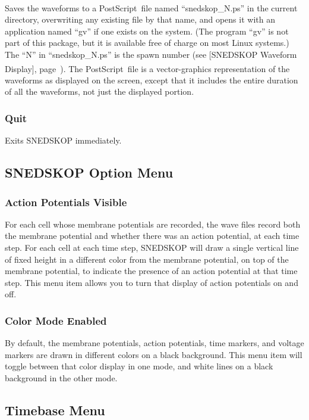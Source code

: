 \documentclass[12pt,openany,oneside]{book}
\newcommand{\tipxref}[1]{see [#1], page~\pageref{#1}}
\newcommand{\registeredsymbol}{\textsuperscript{\textregistered}}
\begin{document}
Saves the waveforms to a PostScript\registeredsymbol\ file named
``snedskop\_N.ps'' in the current directory, overwriting any existing
file by that name, and opens it with an application named ``gv'' if
one exists on the system. (The program ``gv'' is not part of this
package, but it is available free of charge on most Linux systems.)
The ``N'' in ``snedskop\_N.ps'' is the spawn number (\tipxref{SNEDSKOP Waveform Display}).
The PostScript\registeredsymbol\ file is a
vector-graphics representation of the waveforms as displayed on the
screen, except that it includes the entire duration of all the
waveforms, not just the displayed portion.

\subsubsection*{Quit}

Exits SNEDSKOP immediately.


\subsection{SNEDSKOP Option Menu}

\subsubsection*{Action Potentials Visible}

For each cell whose membrane potentials are recorded, the wave files
record both the membrane potential and whether there was an action
potential, at each time step.  For each cell at each time step,
SNEDSKOP will draw a single vertical line of fixed height in a
different color from the membrane potential, on top of the membrane
potential, to indicate the presence of an action potential at that
time step.  This menu item allows you to turn that display of action
potentials on and off.

\subsubsection*{Color Mode Enabled}

By default, the membrane potentials, action potentials, time markers,
and voltage markers are drawn in different colors on a black
background.  This menu item will toggle between that color display in
one mode, and white lines on a black background in the other mode.

\subsection{Timebase Menu}
\label{Timebase Menu}
\end{document}

